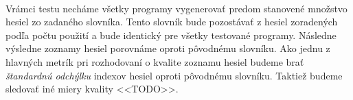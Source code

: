 \paragraph{}
Vrámci testu necháme všetky programy vygenerovať predom stanovené množstvo hesiel zo zadaného slovníka. Tento slovník bude pozostávať z hesiel zoradených podľa počtu použití a bude identický pre všetky testované programy. Následne výsledne zoznamy hesiel porovnáme oproti pôvodnému slovníku. Ako jednu z hlavných metrík pri rozhodovaní o kvalite zoznamu hesiel budeme brať \emph{štandardnú odchýlku} indexov hesiel oproti pôvodnému slovníku. Taktiež budeme sledovať iné miery kvality <<TODO>>.
